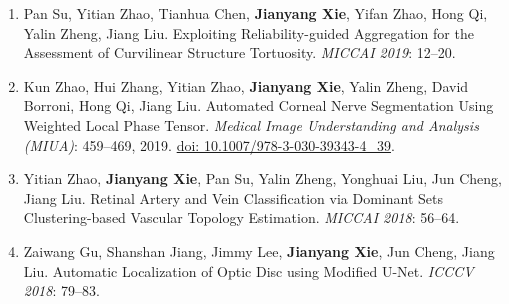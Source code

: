 \documentclass[11pt,a4paper]{article}
\begin{document}
\begin{enumerate}[label={\textcolor{accent}{\sffamily\footnotesize O\arabic*}},leftmargin=2.5em,itemsep=8pt,parsep=0pt]
\item Pan Su, Yitian Zhao, Tianhua Chen, \textbf{Jianyang Xie}, Yifan Zhao, Hong Qi, Yalin Zheng, Jiang Liu. Exploiting Reliability-guided Aggregation for the Assessment of Curvilinear Structure Tortuosity. \textit{MICCAI 2019}: 12--20.
\item Kun Zhao, Hui Zhang, Yitian Zhao, \textbf{Jianyang Xie}, Yalin Zheng, David Borroni, Hong Qi, Jiang Liu. Automated Corneal Nerve Segmentation Using Weighted Local Phase Tensor. \textit{Medical Image Understanding and Analysis (MIUA)}: 459--469, 2019. \href{https://doi.org/10.1007/978-3-030-39343-4_39}{doi: 10.1007/978-3-030-39343-4\_39}.
\item Yitian Zhao, \textbf{Jianyang Xie}, Pan Su, Yalin Zheng, Yonghuai Liu, Jun Cheng, Jiang Liu. Retinal Artery and Vein Classification via Dominant Sets Clustering-based Vascular Topology Estimation. \textit{MICCAI 2018}: 56--64.
\item Zaiwang Gu, Shanshan Jiang, Jimmy Lee, \textbf{Jianyang Xie}, Jun Cheng, Jiang Liu. Automatic Localization of Optic Disc using Modified U-Net. \textit{ICCCV 2018}: 79--83.
\end{enumerate}
\end{document}

